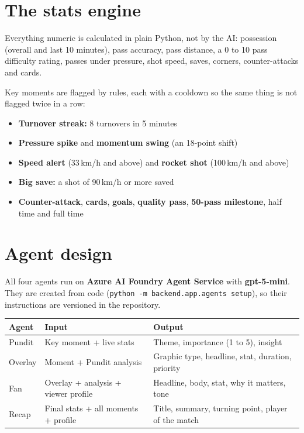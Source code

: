 \documentclass[11pt,a4paper]{article}
\newcommand{\code}[1]{\texttt{#1}}
\begin{document}
\section{The stats engine}

Everything numeric is calculated in plain Python, not by the AI: possession (overall and last 10 minutes), pass accuracy, pass distance, a 0 to 10 pass difficulty rating, passes under pressure, shot speed, saves, corners, counter-attacks and cards.

Key moments are flagged by rules, each with a cooldown so the same thing is not flagged twice in a row:

\begin{itemize}
  \item \textbf{Turnover streak:} 8 turnovers in 5 minutes
  \item \textbf{Pressure spike} and \textbf{momentum swing} (an 18-point shift)
  \item \textbf{Speed alert} (33\,km/h and above) and \textbf{rocket shot} (100\,km/h and above)
  \item \textbf{Big save:} a shot of 90\,km/h or more saved
  \item \textbf{Counter-attack}, \textbf{cards}, \textbf{goals}, \textbf{quality pass}, \textbf{50-pass milestone}, half time and full time
\end{itemize}

\section{Agent design}

All four agents run on \textbf{Azure AI Foundry Agent Service} with \textbf{gpt-5-mini}. They are created from code (\code{python -m backend.app.agents setup}), so their instructions are versioned in the repository.

\begin{tabularx}{\textwidth}{@{}lXX@{}}
\toprule
\textbf{Agent} & \textbf{Input} & \textbf{Output} \\
\midrule
Pundit  & Key moment + live stats                 & Theme, importance (1 to 5), insight \\
Overlay & Moment + Pundit analysis                & Graphic type, headline, stat, duration, priority \\
Fan     & Overlay + analysis + viewer profile     & Headline, body, stat, why it matters, tone \\
Recap   & Final stats + all moments + profile     & Title, summary, turning point, player of the match \\
\bottomrule
\end{tabularx}
\end{document}

